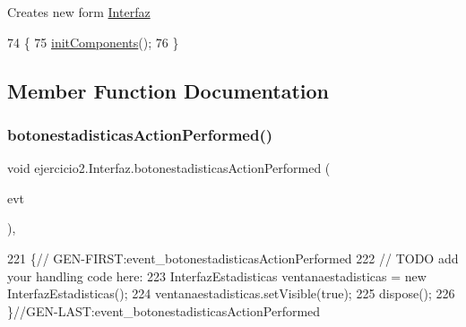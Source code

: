 Creates new form \mbox{\hyperlink{classejercicio2_1_1_interfaz}{Interfaz}} 
\begin{DoxyCode}
74                       \{
75         \mbox{\hyperlink{classejercicio2_1_1_interfaz_a7be742922e57abfe6657157ca275d7fe}{initComponents}}();
76     \}
\end{DoxyCode}


\subsection{Member Function Documentation}
\mbox{\label{classejercicio2_1_1_interfaz_adfb6346933f7d861f81e0f78c2c936b1}} 
\subsubsection{\texorpdfstring{botonestadisticas\+Action\+Performed()}{botonestadisticasActionPerformed()}}
{\footnotesize\ttfamily void ejercicio2.\+Interfaz.\+botonestadisticas\+Action\+Performed (\begin{DoxyParamCaption}\item[{java.\+awt.\+event.\+Action\+Event}]{evt }\end{DoxyParamCaption})\hspace{0.3cm}{\ttfamily [inline]}, {\ttfamily [private]}}


\begin{DoxyCode}
221                                                                                   \{\textcolor{comment}{//
      GEN-FIRST:event\_botonestadisticasActionPerformed}
222         \textcolor{comment}{// TODO add your handling code here:}
223         InterfazEstadisticas ventanaestadisticas = \textcolor{keyword}{new} InterfazEstadisticas();
224         ventanaestadisticas.setVisible(\textcolor{keyword}{true});
225         dispose();
226     \}\textcolor{comment}{//GEN-LAST:event\_botonestadisticasActionPerformed}
\end{DoxyCode}
\mbox{\label{classejercicio2_1_1_interfaz_aeaf9710f39bb49fe8d0a2ab0171740c4}} 

